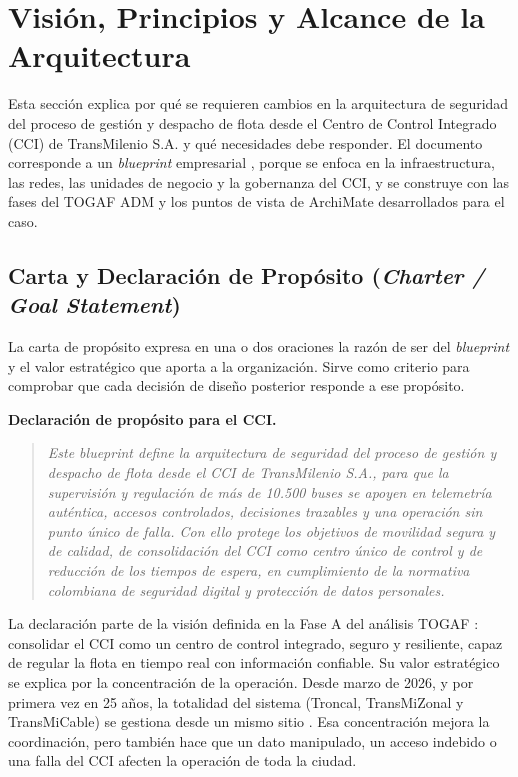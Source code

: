 \section{Visión, Principios y Alcance de la Arquitectura}
Esta sección explica por qué se requieren cambios en la arquitectura de seguridad del proceso de gestión y despacho de flota desde el Centro de Control Integrado (CCI) de TransMilenio S.A. y qué necesidades debe responder. El documento corresponde a un \textit{blueprint} empresarial \parencite{moyle2020practical}, porque se enfoca en la infraestructura, las redes, las unidades de negocio y la gobernanza del CCI, y se construye con las fases del TOGAF ADM y los puntos de vista de ArchiMate desarrollados para el caso.

\subsection{Carta y Declaración de Propósito (\textit{Charter / Goal Statement})}

La carta de propósito expresa en una o dos oraciones la razón de ser del \textit{blueprint} y el valor estratégico que aporta a la organización. Sirve como criterio para comprobar que cada decisión de diseño posterior responde a ese propósito.

\textbf{Declaración de propósito para el CCI.}

\begin{quote}
	\textit{Este blueprint define la arquitectura de seguridad del proceso de gestión y despacho de flota desde el CCI de TransMilenio S.A., para que la supervisión y regulación de más de 10.500 buses se apoyen en telemetría auténtica, accesos controlados, decisiones trazables y una operación sin punto único de falla. Con ello protege los objetivos de movilidad segura y de calidad, de consolidación del CCI como centro único de control y de reducción de los tiempos de espera, en cumplimiento de la normativa colombiana de seguridad digital y protección de datos personales.}
\end{quote}

La declaración parte de la visión definida en la Fase A del análisis TOGAF \parencite{fase1cci2026}: consolidar el CCI como un centro de control integrado, seguro y resiliente, capaz de regular la flota en tiempo real con información confiable. Su valor estratégico se explica por la concentración de la operación. Desde marzo de 2026, y por primera vez en 25 años, la totalidad del sistema (Troncal, TransMiZonal y TransMiCable) se gestiona desde un mismo sitio \parencite{transmilenio2026cci}. Esa concentración mejora la coordinación, pero también hace que un dato manipulado, un acceso indebido o una falla del CCI afecten la operación de toda la ciudad.

